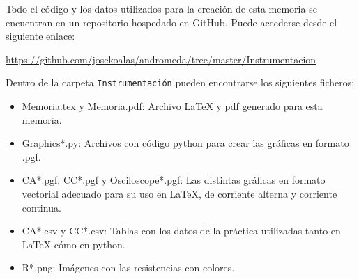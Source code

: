 \documentclass[12pt, a4paper, titlepage]{article}
\newcommand{\code}[1]{\texttt{#1}} %
\begin{document}
\begin{appendices}
    Todo el código y los datos utilizados para la creación de esta memoria se encuentran en un repositorio hospedado en GitHub. Puede accederse desde el siguiente enlace:

    \url{https://github.com/josekoalas/andromeda/tree/master/Instrumentacion}

    Dentro de la carpeta \code{Instrumentación} pueden encontrarse los siguientes ficheros:

    \begin{itemize}[label=$-$]
      \item Memoria.tex y Memoria.pdf: Archivo LaTeX y pdf generado para esta memoria.
      \item Graphics*.py: Archivos con código python para crear las gráficas en formato .pgf.
      \item CA*.pgf, CC*.pgf y Osciloscope*.pgf: Las distintas gráficas en formato vectorial adecuado para su uso en LaTeX, de corriente alterna y corriente continua.
      \item CA*.csv y CC*.csv: Tablas con los datos de la práctica utilizadas tanto en LaTeX cómo en python.
      \item R*.png: Imágenes con las resistencias con colores.
    \end{itemize}

  \end{appendices}
\end{document}
